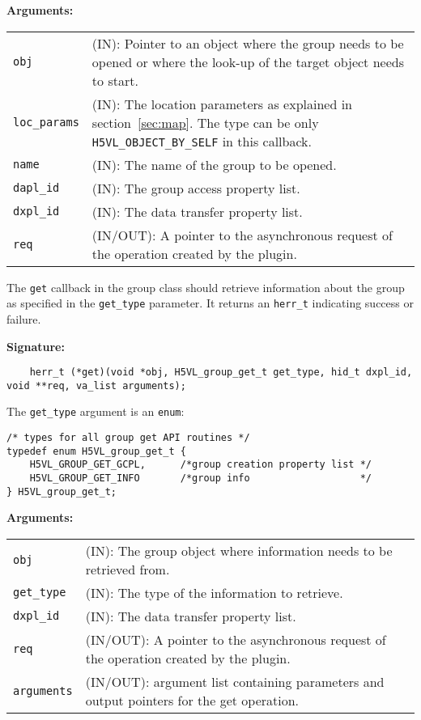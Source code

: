 \textbf{Arguments:}\\
\begin{tabular}{l p{10cm}}
  {\tt obj} & (IN): Pointer to an object where the group needs to be
  opened or where the look-up of the target object needs to start.\\
  {\tt loc\_params} & (IN): The location parameters as explained in
  section~\ref{sec:map}. The type can be only {\tt
    H5VL\_OBJECT\_BY\_SELF} in this callback. \\
  {\tt name} & (IN): The name of the group to be opened.\\
  {\tt dapl\_id} & (IN): The group access property list.\\
  {\tt dxpl\_id} & (IN): The data transfer property list.\\
  {\tt req} & (IN/OUT): A pointer to the asynchronous request of the
  operation created by the plugin.\\
\end{tabular}

The {\tt get} callback in the group class should retrieve information
about the group as specified in the {\tt get\_type} parameter. It
returns an {\tt herr\_t} indicating success or failure.

\textbf{Signature:}
\begin{lstlisting}
    herr_t (*get)(void *obj, H5VL_group_get_t get_type, hid_t dxpl_id, void **req, va_list arguments);
\end{lstlisting}

The {\tt get\_type} argument is an {\tt enum}:
\begin{lstlisting}
/* types for all group get API routines */
typedef enum H5VL_group_get_t {
    H5VL_GROUP_GET_GCPL,      /*group creation property list */
    H5VL_GROUP_GET_INFO       /*group info                   */
} H5VL_group_get_t;
\end{lstlisting}

\textbf{Arguments:}\\
\begin{tabular}{l p{10cm}}
  {\tt obj} & (IN): The group object where information needs to be
  retrieved from.\\
  {\tt get\_type} & (IN): The type of the information to retrieve.\\
  {\tt dxpl\_id} & (IN): The data transfer property list.\\
  {\tt req} & (IN/OUT): A pointer to the asynchronous request of the
  operation created by the plugin.\\
  {\tt arguments} & (IN/OUT): argument list containing parameters and
  output pointers for the get operation. \\
\end{tabular}

